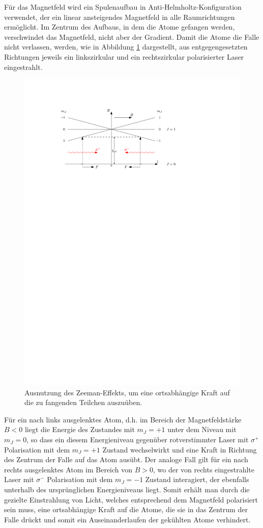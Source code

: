 \documentclass[11pt, a4paper]{article}
\numberwithin{equation}{section}
\begin{document}
Für das Magnetfeld wird ein Spulenaufbau in Anti-Helmholtz-Konfiguration verwendet, der ein linear ansteigendes Magnetfeld in alle Raumrichtungen ermöglicht.
Im Zentrum des Aufbaus, in dem die Atome gefangen werden, verschwindet das Magnetfeld, nicht aber der Gradient.
Damit die Atome die Falle nicht verlassen, werden, wie in Abbildung \ref{fig:magnetfeld} dargestellt, aus entgegengesetzten Richtungen jeweils ein linkszirkular und ein rechtszirkular polarisierter Laser eingestrahlt.
\begin{figure}[h]
	\centering
	\includegraphics[width=.8\textwidth]{./figures/theory/mot.pdf}
	\caption{Ausnutzung des Zeeman-Effekts, um eine ortsabhängige Kraft auf die zu fangenden Teilchen auszuüben.}
	\label{fig:magnetfeld}
\end{figure}
Für ein nach links ausgelenktes Atom, d.h. im Bereich der Magnetfeldstärke $B<0$ liegt die Energie des Zustandes mit $m_J=+1$ unter dem Niveau mit $m_J=0$, so dass ein diesem Energieniveau gegenüber rotverstimmter Laser mit $\sigma^+$ Polarisation mit dem $m_J=+1$ Zustand wechselwirkt und eine Kraft in Richtung des Zentrum der Falle auf das Atom ausübt.
Der analoge Fall gilt für ein nach rechts ausgelenktes Atom im Bereich von $B>0$, wo der von rechts eingestrahlte Laser mit $\sigma^-$ Polarisation mit dem $m_J=-1$ Zustand interagiert, der ebenfalls unterhalb des ursprünglichen Energieniveaus liegt.
Somit erhält man durch die gezielte Einstrahlung von Licht, welches entsprechend dem Magnetfeld polarisiert sein muss, eine ortsabhängige Kraft auf die Atome, die sie in das Zentrum der Falle drückt und somit ein Auseinanderlaufen der gekühlten Atome verhindert.
\end{document}
